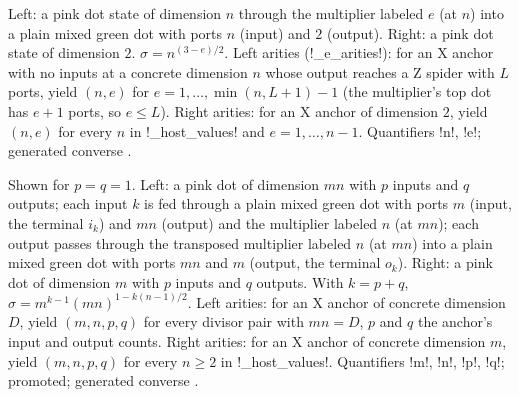 Left: a pink dot state of dimension $n$ through the multiplier labeled $e$ (at $n$) into a plain
mixed green dot with ports $n$ (input) and $2$ (output). Right: a pink dot state of dimension $2$.
$\sigma=n^{(3-e)/2}$. Left arities (\py!_e_arities!): for an X anchor with no inputs at a concrete
dimension $n$ whose output reaches a Z spider with $L$ ports, yield $(n,e)$ for
$e=1,\dots,\min(n,L+1)-1$ (the multiplier's top dot has $e+1$ ports, so $e\le L$). Right arities:
for an X anchor of dimension $2$, yield $(n,e)$ for every $n$ in \py!_host_values! and
$e=1,\dots,n-1$. Quantifiers \code!n!, \code!e!; generated converse .

Shown for $p=q=1$. Left: a pink dot of dimension $mn$ with $p$ inputs and $q$ outputs; each input
$k$ is fed through a plain mixed green dot with ports $m$ (input, the terminal $i_k$) and $mn$
(output) and the multiplier labeled $n$ (at $mn$); each output passes through the transposed
multiplier labeled $n$ (at $mn$) into a plain mixed green dot with ports $mn$ and $m$ (output,
the terminal $o_k$). Right: a pink dot of dimension $m$ with $p$ inputs and $q$ outputs. With
$k=p+q$, $\sigma=m^{k-1}(mn)^{1-k(n-1)/2}$. Left arities: for an X anchor of concrete dimension
$D$, yield $(m,n,p,q)$ for every divisor pair with $mn=D$, $p$ and $q$ the anchor's input and output
counts. Right arities: for an X anchor of concrete dimension $m$, yield $(m,n,p,q)$ for every
$n\ge2$ in \py!_host_values!. Quantifiers \code!m!, \code!n!, \code!p!, \code!q!; promoted;
generated converse .

